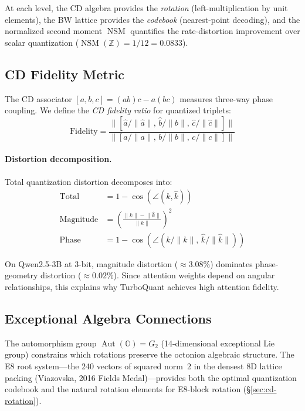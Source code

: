 \documentclass[sigconf,anonymous,review]{acmart}
\DeclareMathOperator{\Aut}{Aut}
\DeclareMathOperator{\NSM}{NSM}
\newcommand{\OO}{\mathbb{O}}
\newcommand{\norm}[1]{\lVert #1 \rVert}
\begin{document}
At each level, the CD algebra provides the \emph{rotation}
(left-multiplication by unit elements), the BW lattice provides the
\emph{codebook} (nearest-point decoding), and the normalized second
moment $\NSM$ quantifies the rate-distortion improvement over scalar
quantization ($\NSM(\mathbb{Z}) = 1/12 = 0.0833$).

\subsection{CD Fidelity Metric}

The CD associator $[a,b,c] = (ab)c - a(bc)$ measures three-way
phase coupling. We define the \emph{CD fidelity ratio} for quantized
triplets:
\begin{equation}
  \text{Fidelity} = \frac{\norm{[\hat{a}/\norm{\hat{a}},\,
    \hat{b}/\norm{\hat{b}},\, \hat{c}/\norm{\hat{c}}]}}
  {\norm{[a/\norm{a},\, b/\norm{b},\, c/\norm{c}]}}
  \label{eq:fidelity}
\end{equation}

\paragraph{Distortion decomposition.}
Total quantization distortion decomposes into:
\begin{align}
  \text{Total} &= 1 - \cos(\angle(k, \hat{k})) \\
  \text{Magnitude} &= \left(\frac{\norm{k} - \norm{\hat{k}}}{\norm{k}}\right)^2 \\
  \text{Phase} &= 1 - \cos(\angle(k/\norm{k},\, \hat{k}/\norm{\hat{k}}))
\end{align}

On Qwen2.5-3B at 3-bit, magnitude distortion ($\approx 3.08\%$)
dominates phase-geometry distortion ($\approx 0.02\%$).
Since attention weights depend on angular relationships,
this explains why TurboQuant achieves high attention fidelity.

\subsection{Exceptional Algebra Connections}

The automorphism group $\Aut(\OO) = G_2$ (14-dimensional exceptional
Lie group) constrains which rotations preserve the octonion algebraic
structure. The E8 root system---the 240 vectors of squared norm~2
in the densest 8D lattice packing (Viazovska, 2016 Fields Medal)---provides
both the optimal quantization codebook and the natural rotation elements
for E8-block rotation (\S\ref{sec:cd-rotation}).
\end{document}
